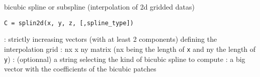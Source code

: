 
\begin{mandesc}
   {bicubic spline or subspline (interpolation of 2d
    gridded datas)}
\end{mandesc}

\begin{calling_sequence}
\begin{verbatim}
C = splin2d(x, y, z, [,spline_type])
\end{verbatim}
\end{calling_sequence}

\begin{parameters}
  \begin{varlist}
   : strictly increasing vectors (with at least 2 components)
               defining the interpolation grid
   : nx x ny matrix (nx being the length of \verb!x! and 
               ny the length of \verb!y!)
   : (optionnal) a string selecting the kind of bicubic spline to compute
   : a big vector with the coefficients of the bicubic patches
  \end{varlist}
\end{parameters}

